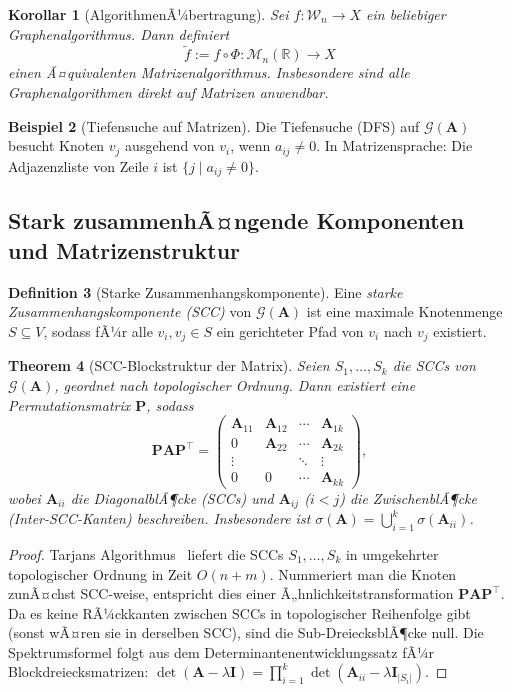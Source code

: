 ﻿\documentclass[12pt, a4paper]{article}
\newtheorem{theorem}{Theorem}[section]
\newtheorem{corollary}[theorem]{Korollar}
\theoremstyle{definition}
\newtheorem{definition}[theorem]{Definition}
\newtheorem{example}[theorem]{Beispiel}
\theoremstyle{remark}
\newcommand{\R}{\mathbb{R}}
\newcommand{\vA}{\bm{A}}
\newcommand{\vP}{\bm{P}}
\newcommand{\vI}{\bm{I}}
\newcommand{\T}{\top}
\newcommand{\spec}{\sigma}
\begin{document}
\begin{corollary}[AlgorithmenÃ¼bertragung]
\label{cor:algo}
Sei $f: \mathcal{W}_n \to X$ ein beliebiger Graphenalgorithmus. Dann
definiert
\[
  \tilde{f} := f \circ \Phi: \mathcal{M}_n(\R) \to X
\]
einen Ã¤quivalenten Matrizenalgorithmus. Insbesondere sind alle
Graphenalgorithmen direkt auf Matrizen anwendbar.
\end{corollary}

\begin{example}[Tiefensuche auf Matrizen]
Die Tiefensuche (DFS) auf $\mathcal{G}(\vA)$ besucht Knoten $v_j$
ausgehend von $v_i$, wenn $a_{ij} \neq 0$. In Matrizensprache:
Die Adjazenzliste von Zeile $i$ ist $\{j \mid a_{ij} \neq 0\}$.
\end{example}

\subsection{Stark zusammenhÃ¤ngende Komponenten und Matrizenstruktur}
\label{subsec:scc}

\begin{definition}[Starke Zusammenhangskomponente]
Eine \emph{starke Zusammenhangskomponente (SCC)} von $\mathcal{G}(\vA)$
ist eine maximale Knotenmenge $S \subseteq V$, sodass fÃ¼r alle
$v_i, v_j \in S$ ein gerichteter Pfad von $v_i$ nach $v_j$ existiert.
\end{definition}

\begin{theorem}[SCC-Blockstruktur der Matrix]
\label{thm:scc_block}
Seien $S_1, \ldots, S_k$ die SCCs von $\mathcal{G}(\vA)$, geordnet nach
topologischer Ordnung. Dann existiert eine Permutationsmatrix $\vP$, sodass
\[
  \vP \vA \vP^\T =
  \begin{pmatrix}
    \vA_{11} & \vA_{12} & \cdots & \vA_{1k} \\
    0        & \vA_{22} & \cdots & \vA_{2k} \\
    \vdots   &          & \ddots & \vdots   \\
    0        & 0        & \cdots & \vA_{kk}
  \end{pmatrix},
\]
wobei $\vA_{ii}$ die DiagonalblÃ¶cke (SCCs) und $\vA_{ij}$ ($i < j$)
die ZwischenblÃ¶cke (Inter-SCC-Kanten) beschreiben. Insbesondere ist
$\spec(\vA) = \bigcup_{i=1}^k \spec(\vA_{ii})$.
\end{theorem}

\begin{proof}
Tarjans Algorithmus~\citep{tarjan1972} liefert die SCCs $S_1,\ldots,S_k$
in umgekehrter topologischer Ordnung in Zeit $O(n+m)$. Nummeriert man
die Knoten zunÃ¤chst SCC-weise, entspricht dies einer Ã„hnlichkeitstransformation
$\vP \vA \vP^\T$. Da es keine RÃ¼ckkanten zwischen SCCs in topologischer
Reihenfolge gibt (sonst wÃ¤ren sie in derselben SCC), sind die
Sub-DreiecksblÃ¶cke null. Die Spektrumsformel folgt aus dem
Determinantenentwicklungssatz fÃ¼r Blockdreiecksmatrizen:
$\det(\vA - \lambda \vI) = \prod_{i=1}^k \det(\vA_{ii} - \lambda \vI_{|S_i|})$.
\end{proof}
\end{document}
